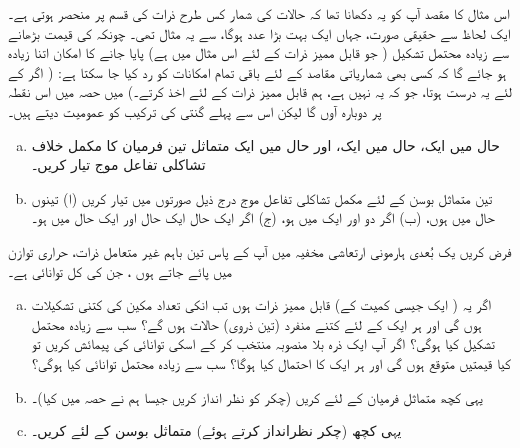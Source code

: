 اس مثال کا مقصد آپ کو یہ دکھانا تھا کہ  حالات کی شمار کس طرح   ذرات کی قسم پر منحصر ہوتی ہے۔ ایک لحاظ سے  حقیقی صورت،  جہاں  ایک بہت بڑا عدد ہوگا،  سے یہ مثال  تھی۔ چونکہ  کی قیمت بڑھانے سے زیادہ محتمل تشکیل (  جو قابل ممیز ذرات کے لئے اس مثال میں  ہے)   پایا  جانے کا امکان اتنا زیادہ ہو جائے گا کہ کسی بھی شماریاتی مقاصد کے لئے  باقی تمام امکانات کو رد کیا جا سکتا ہے: ( اگر    کے لئے یہ  درست ہوتا، جو کہ یہ نہیں ہے، ہم قابل ممیز ذرات کے لئے       اخذ کرتے۔) میں حصہ    میں اس نقطہ پر دوبارہ  آوں گا لیکن اس سے پہلے گنتی کی ترکیب کو عمومیت دیتے ہیں۔



\begin{enumerate}[a.]
\item
حال  میں ایک،  حال  میں ایک،  اور حال  میں ایک متماثل تین فرمیان کا مکمل خلاف تشاکلی تفاعل موج  تیار کریں۔
\item
 تین متماثل بوسن کے لئے مکمل تشاکلی تفاعل موج درج ذیل صورتوں میں تیار کریں (ا) تینوں حال  میں ہوں، (ب) اگر دو  اور ایک  میں ہو، (ج) اگر ایک حال  ایک حال  اور ایک حال  میں ہو۔ 
\end{enumerate}
فرض کریں یک بُعدی ہارمونی ارتعاشی مخفیہ میں آپ کے پاس تین باہم غیر متعامل ذرات،   حراری توازن میں پائے جاتے ہوں ،  جن کی کل توانائی ہے۔
\begin{enumerate}[a.]
\item
 اگر یہ  ( ایک جیسی کمیت کے)  قابل ممیز ذرات ہوں تب انکی  تعداد مکین کی کتنی  تشکیلات  ہوں گی  اور ہر ایک کے لئے کتنے منفرد  (تین ذروی)  حالات ہوں گے؟ سب سے زیادہ محتمل تشکیل کیا ہوگی؟ اگر آپ ایک ذرہ  بلا منصوبہ منتخب کر کے اسکی توانائی کی پیمائش کریں تو کیا قیمتیں متوقع ہوں گی  اور ہر ایک کا احتمال کیا ہوگا؟ سب سے زیادہ محتمل توانائی کیا ہوگی؟
\item
 یہی کچھ متماثل فرمیان کے لئے کریں (چکر کو نظر انداز کریں جیسا ہم نے حصہ    میں کیا)۔
\item
 یہی کچھ  (چکر نظرانداز کرتے ہوئے)  متماثل بوسن کے لئے کریں۔ 
 \end{enumerate}

